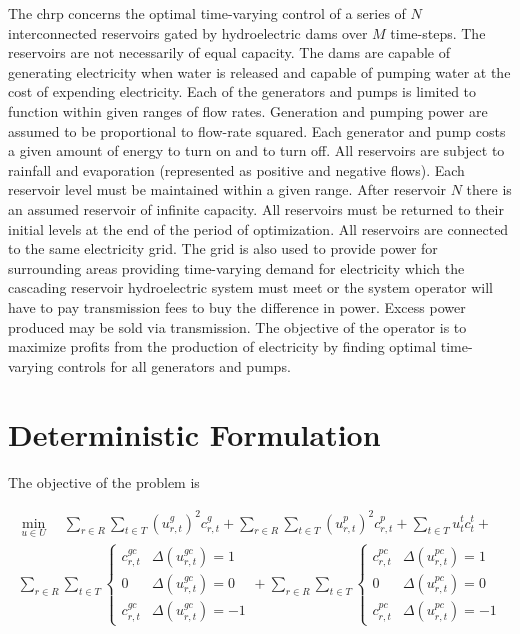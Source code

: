\documentclass[12pt]{article}
\begin{document}
The \gls{chrp} concerns the optimal time-varying control of a series of $N$ interconnected reservoirs gated by hydroelectric dams over $M$ time-steps. The reservoirs are not necessarily of equal capacity. The dams are capable of generating electricity when water is released and capable of pumping water at the cost of expending electricity. Each of the generators and pumps is limited to function within given ranges of flow rates. Generation and pumping power are assumed to be proportional to flow-rate squared. Each generator and pump costs a given amount of energy to turn on and to turn off. All reservoirs are subject to rainfall and evaporation (represented as positive and negative flows). Each reservoir level must be maintained within a given range. After reservoir $N$ there is an assumed reservoir of infinite capacity. All reservoirs must be returned to their initial levels at the end of the period of optimization. All reservoirs are connected to the same electricity grid. The grid is also used to provide power for surrounding areas providing time-varying demand for electricity which the cascading reservoir hydroelectric system must meet or the system operator will have to pay transmission fees to buy the difference in power. Excess power produced may be sold via transmission. The objective of the operator is to maximize profits from the production of electricity by finding optimal time-varying controls for all generators and pumps.

\section*{Deterministic Formulation}

The objective of the problem is

\begin{gather}
	\min_{u\in U}\quad
	\sum_{r\in R}\sum_{t\in T}(u_{r,t}^{g})^2c_{r,t}^{g}+
	\sum_{r\in R}\sum_{t\in T}(u_{r,t}^{p})^2c_{r,t}^{p}+
	\sum_{t\in T}u_{t}^{t}c_{t}^{t}+\\
	\sum_{r\in R}\sum_{t\in T}\begin{cases}
		c_{r,t}^{gc} & \Delta(u_{r,t}^{gc})=1\\
		0 & \Delta(u_{r,t}^{gc})=0\\
		c_{r,t}^{gc} & \Delta(u_{r,t}^{gc})=-1
	\end{cases}+
	\sum_{r\in R}\sum_{t\in T}\begin{cases}
		c_{r,t}^{pc} & \Delta(u_{r,t}^{pc})=1\\
		0 & \Delta(u_{r,t}^{pc})=0\\
		c_{r,t}^{pc} & \Delta(u_{r,t}^{pc})=-1
	\end{cases}\label{eq:obj}
\end{gather}
\end{document}
